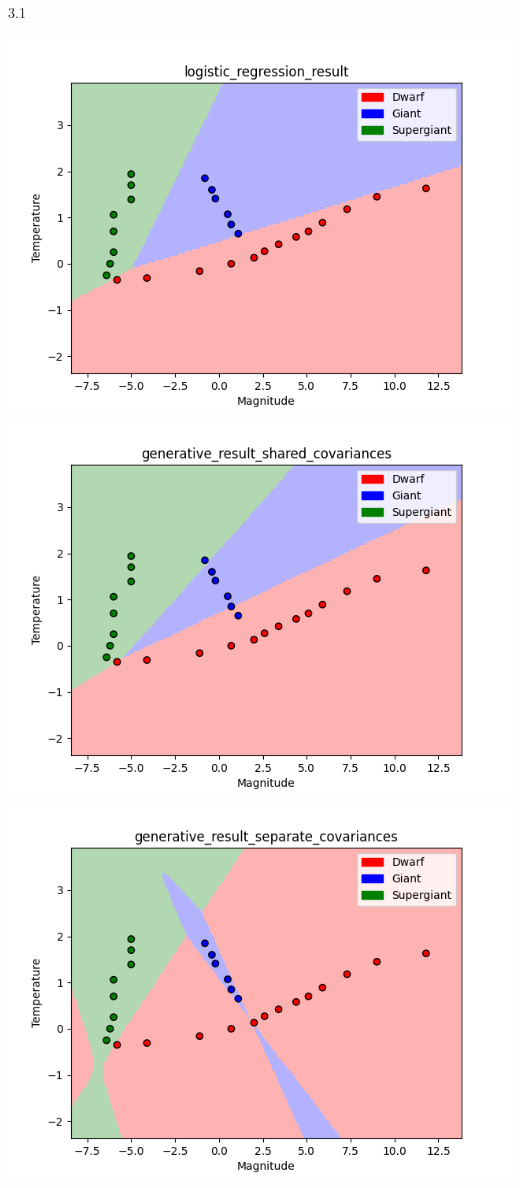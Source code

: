 \documentclass[submit]{harvardml}
\begin{document}
3.1
\begin{center}
    \includegraphics[scale=0.7]{logistic_regression_result.png}\\
    \includegraphics[scale=0.7]{generative_result_shared_covariances.png}\\
    \includegraphics[scale=0.7]{generative_result_separate_covariances.png}\\

\end{center}
\end{document}
